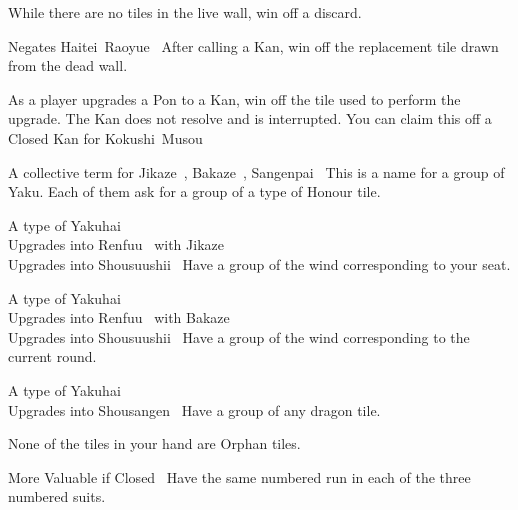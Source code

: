 	{}
	{While there are no tiles in the live wall, win off a discard.}

	{\symbnegate Negates Haitei~Raoyue~}
	{After calling a Kan, win off the replacement tile drawn from the dead wall.}

	{}
	{As a player upgrades a Pon to a Kan, win off the tile used to perform the upgrade. The Kan does not resolve and is interrupted. You can claim this off a Closed Kan for Kokushi~Musou~}

	{\upgradesto A collective term for Jikaze~, Bakaze~, Sangenpai~}
	{This is a name for a group of Yaku. Each of them ask for a group of a type of Honour tile.}

	{\upgradesfrom A type of Yakuhai~\\
	\upgradesto Upgrades into Renfuu~ with Jikaze~\\
	\upgradesto Upgrades into Shousuushii~}
	{Have a group of the wind corresponding to your seat.}

	{\upgradesfrom A type of Yakuhai~\\
	\upgradesto Upgrades into Renfuu~ with Bakaze~\\
	\upgradesto Upgrades into Shousuushii~}
	{Have a group of the wind corresponding to the current round.}

	{\upgradesfrom A type of Yakuhai~\\
	\upgradesto Upgrades into Shousangen~}
	{Have a group of any dragon tile.}

	{}
	{None of the tiles in your hand are Orphan tiles.}

	{\morevaluable More Valuable if Closed~}
	{Have the same numbered run in each of the three numbered suits.}

